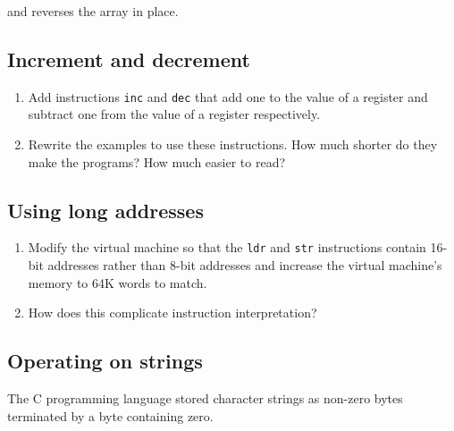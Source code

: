 \documentclass[krantzl]{krantz}
\begin{document}
\noindent and reverses the array in place.

\subsection*{Increment and decrement}

\begin{enumerate}

\item 

Add instructions \texttt{inc} and \texttt{dec} that add one to the value of a register
    and subtract one from the value of a register respectively.



\item 

Rewrite the examples to use these instructions.
    How much shorter do they make the programs?
    How much easier to read?



\end{enumerate}

\subsection*{Using long addresses}

\begin{enumerate}

\item 

Modify the virtual machine so that the \texttt{ldr} and \texttt{str} instructions
    contain 16-bit addresses rather than 8-bit addresses
    and increase the virtual machine’s memory to 64K words to match.



\item 

How does this complicate instruction interpretation?



\end{enumerate}

\subsection*{Operating on strings}


The C programming language stored character strings as non-zero bytes terminated by a byte containing zero.
\end{document}
